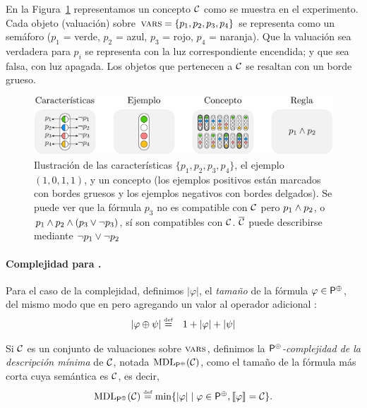 En la Figura~\ref{semaforos} representamos un concepto $\mathcal{C}$ como se muestra en el experimento. Cada objeto (valuación) sobre $\textsc{vars}=\{p_1,p_2,p_3,p_4\}$ se representa como un semáforo ($p_1$ = verde, $p_2$ = azul, $p_3$ = rojo, $p_4$ = naranja). Que la valuación sea verdadera para $p_i$ se representa con la luz correspondiente encendida; y que sea falsa, con luz apagada. Los objetos que pertenecen a $\mathcal{C}$ se resaltan con un borde grueso. 

\begin{figure}[h]
\includegraphics[scale=.6]{../figuras/pre/notacion.pdf}
\caption{Ilustración de las características $\{p_1,p_2,p_3,p_4\}$, el ejemplo $(1,0,1,1)$, y un concepto (los ejemplos positivos están marcados con bordes gruesos y los ejemplos negativos con bordes delgados). Se puede ver que la fórmula $p_3$ no es compatible con $\mathcal{C}$ pero $p_1 \wedge p_2$, o $p_1 \wedge p_2 \wedge (p_3 \vee \lnot p_3)$, sí son compatibles con $\mathcal{C}$. $\overline {\mathcal{C}}$ puede describirse mediante $\lnot p_1\vee \lnot p_2$ }\label{semaforos}
\end{figure}


\paragraph{Complejidad para \gramboolxor.} Para el caso de la complejidad, definimos $|\varphi|$, el {\em tamaño} de la fórmula $\varphi\in{\sf P}^\oplus$, del mismo modo que en \grambool pero agregando un valor al operador adicional :
\begin{eqnarray*}
|\varphi\oplus\psi| &\stackrel{\scriptscriptstyle \mathrm{def}}{=}& 1+|\varphi|+|\psi|
\end{eqnarray*}


Si $\mathcal{C}$ es un conjunto de valuaciones sobre $\textsc{vars}$, definimos la {\em ${\sf P}^\oplus$-complejidad de la descripción mínima} de $\mathcal{C}$, notada ${\rm MDL}_{{\sf P}^\oplus}(\mathcal{C})$, como el tamaño de la fórmula más corta cuya semántica es $\mathcal{C}$, es decir,
$$
{\rm MDL}_{{\sf P}^\oplus}(\mathcal{C})\stackrel{\scriptscriptstyle \mathrm{def}}{=}\min\{|\varphi|\mid \varphi\in{\sf P}^\oplus,\llbracket \varphi\rrbracket=\mathcal{C}\}.
$$

